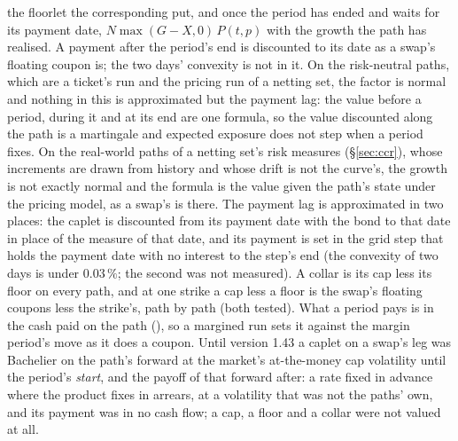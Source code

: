 \documentclass[11pt,a4paper]{article}
\newcommand{\code}[1]{\ifmmode\text{\small\texttt{\detokenize{#1}}}\else{\small\path{#1}}\fi}
\begin{document}
the floorlet the corresponding put, and once the period has ended and waits for its payment date, $N\max(G-X,0)\,P(t,p)$ with the growth the path has realised. A payment after the period's end is discounted to its date as a swap's floating coupon is; the two days' convexity is not in it. On the risk-neutral paths, which are a ticket's run and the pricing run of a netting set, the factor is normal and nothing in this is approximated but the payment lag: the value before a period, during it and at its end are one formula, so the value discounted along the path is a martingale and expected exposure does not step when a period fixes. On the real-world paths of a netting set's risk measures (\S\ref{sec:ccr}), whose increments are drawn from history and whose drift is not the curve's, the growth is not exactly normal and the formula is the value given the path's state under the pricing model, as a swap's is there. The payment lag is approximated in two places: the caplet is discounted from its payment date with the bond to that date in place of the measure of that date, and its payment is set in the grid step that holds the payment date with no interest to the step's end (the convexity of two days is under $0.03\,\%$; the second was not measured). A collar is its cap less its floor on every path, and at one strike a cap less a floor is the swap's floating coupons less the strike's, path by path (both tested). What a period pays is in the cash paid on the path (\code{caplet\_flows}), so a margined run sets it against the margin period's move as it does a coupon. Until version 1.43 a caplet on a swap's leg was Bachelier on the path's forward at the market's at-the-money cap volatility until the period's \emph{start}, and the payoff of that forward after: a rate fixed in advance where the product fixes in arrears, at a volatility that was not the paths' own, and its payment was in no cash flow; a cap, a floor and a collar were not valued at all.
\end{document}
